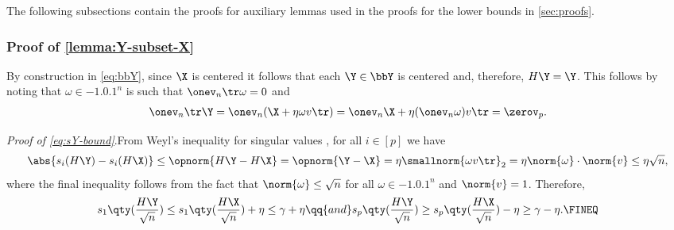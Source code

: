 \documentclass[10pt]{article}
\begin{document}
The following subsections contain the proofs for auxiliary lemmas used in the  proofs for the lower bounds in \cref{sec:proofs}.




\subsubsection{Proof of \cref{lemma:Y-subset-X}}
\label{proof:lemma:Y-subset-X}

By construction in \cref{eq:bbY}, since $\X$ is centered it follows that each $\Y \in \bbY$ is centered and, therefore, $H\Y= \Y$. This follows by noting that $\omega \in \qty{-1, 0, 1}^n$ is such that $\onev_n\tr\omega = 0$ and
\begin{align}
    \onev_n\tr\Y = \onev_n(\X + \eta\omega v\tr) = \onev_n\X + \eta(\onev_n\omega) v\tr = \zerov_p.\label{eq:Y-center}
\end{align}

\noindent\textit{Proof of \ref{eq:sY-bound}}.\quad From Weyl's inequality for singular values \citep[{Corollary 7.3.5}]{horn2012matrix}, for all $i \in [p]$ we have
\begin{align}
    \abs{ s_i(H\Y) - s_i(H\X) } \le \opnorm{H\Y - H\X} = \opnorm{\Y-\X} = \eta\smallnorm{\omega v\tr}_2 = \eta\norm{\omega}\cdot\norm{v} \le \eta\sqrt{n},
\end{align}
where the final inequality follows from the fact that $\norm{\omega} \le \sqrt{n}$ for all $\omega \in \qty{-1, 0, 1}^n$ and ${\norm{v}=1}$. Therefore, 
\begin{align}
    s_1\qty(\frac{H\Y}{\sqrt{n}}) \le s_1\qty(\frac{H\X}{\sqrt{n}}) + \eta \le \gamma + \eta \qq{and} s_p\qty(\frac{H\Y}{\sqrt{n}}) \ge s_p\qty(\frac{H\X}{\sqrt{n}}) - \eta \ge \gamma - \eta.\FINEQ
\end{align}
\end{document}
